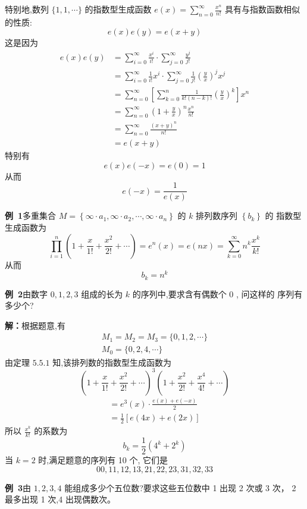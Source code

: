 \documentclass{report}
\begin{document}
特别地,数列 $\{1,1, \cdots\}$ 的指数型生成函数 $e(x)=\sum_{n=0}^{\infty} \frac{x^{n}}{n !}$ 具有与指数函数相似的性质:
$$
e(x) e(y)=e(x+y)
$$
这是因为
$$
\begin{aligned}
e(x) e(y) &=\sum_{i=0}^{\infty} \frac{x^{i}}{i !} \cdot \sum_{j=0}^{\infty} \frac{y^{j}}{j !} \\
&=\sum_{i=0}^{\infty} \frac{1}{i !} x^{i} \cdot \sum_{j=0}^{\infty} \frac{1}{j !}\left(\frac{y}{x}\right)^{j} x^{j} \\
&=\sum_{n=0}^{\infty}\left[\sum_{k=0}^{n} \frac{1}{k !(n-k) !}\left(\frac{y}{x}\right)^{k}\right] x^{n} \\
&=\sum_{n=0}^{\infty}\left(1+\frac{y}{x}\right)^{n} \frac{x^{n}}{n !} \\
&=\sum_{n=0}^{\infty} \frac{(x+y)^{n}}{n !} \\
&=e(x+y)
\end{aligned}
$$
特别有
$$
e(x) e(-x)=e(0)=1
$$
从而
$$
e(-x)=\frac{1}{e(x)}
$$

\noindent
\textbf{例\ 1}多重集合 $M=\left\{\infty \cdot a_{1}, \infty \cdot a_{2}, \cdots, \infty \cdot a_{n}\right\}$ 的 $k$ 排列数序列 $\left\{b_{k}\right\}$ 的 指数型生成函数为
$$
\prod_{i=1}^{n}\left(1+\frac{x}{1 !}+\frac{x^{2}}{2 !}+\cdots\right)=e^{n}(x)=e(n x)=\sum_{k=0}^{\infty} n^{k} \frac{x^{k}}{k !}
$$
从而
$$
b_{k}=n^{k}
$$

\noindent
\textbf{例\ 2}由数字 $0,1,2,3$ 组成的长为 $k$ 的序列中,要求含有偶数个 0 , 问这样的 序列有多少个?

\textbf{解：}根据题意,有
$$
\begin{array}{l}
M_{1}=M_{2}=M_{3}=\{0,1,2, \cdots\} \\
M_{0}=\{0,2,4, \cdots\}
\end{array}
$$
由定理 $5.5.1$ 知,该排列数的指数型生成函数为
$$
\left(1+\frac{x}{1 !}+\frac{x^{2}}{2 !}+\cdots\right)^{3}\left(1+\frac{x^{2}}{2 !}+\frac{x^{4}}{4 !}+\cdots\right)
$$
$$
\begin{array}{l}
=e^{3}(x) \cdot \frac{e(x)+e(-x)}{2} \\
=\frac{1}{2}[e(4 x)+e(2 x)]
\end{array}
$$
所以 $\frac{x^{k}}{k !}$ 的系数为
$$
b_{k}=\frac{1}{2}\left(4^{k}+2^{k}\right)
$$
当 $k=2$ 时,满足题意的序列有 10 个, 它们是
$$
00,11,12,13,21,22,23,31,32,33
$$

\noindent
\textbf{例\ 3}由 $1,2,3,4$ 能组成多少个五位数?要求这些五位数中 1 出现 2 次或 3 次， 2 最多出现 1 次,4 出现偶数次。
\end{document}
